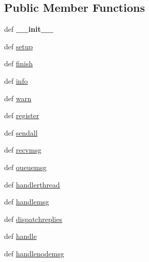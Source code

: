 \subsection*{Public Member Functions}
\begin{DoxyCompactItemize}
\item 
\hypertarget{classcore_1_1coreserver_1_1_core_request_handler_ac0ae6bd3cd1de47c47234e4f2ede84d5}{def {\bfseries \+\_\+\+\_\+init\+\_\+\+\_\+}}\label{classcore_1_1coreserver_1_1_core_request_handler_ac0ae6bd3cd1de47c47234e4f2ede84d5}

\item 
def \hyperlink{classcore_1_1coreserver_1_1_core_request_handler_a08012ae7f3b607a6e5309be961fa6de2}{setup}
\item 
def \hyperlink{classcore_1_1coreserver_1_1_core_request_handler_a8284268bb5515abe6e525ea0fedb5b04}{finish}
\item 
def \hyperlink{classcore_1_1coreserver_1_1_core_request_handler_a63af1dbd88a97af1c8788c979b995792}{info}
\item 
def \hyperlink{classcore_1_1coreserver_1_1_core_request_handler_a0f4f6eee112068adc26f8edd009f0f0d}{warn}
\item 
def \hyperlink{classcore_1_1coreserver_1_1_core_request_handler_a191167b6251c9224977f11a3ca979299}{register}
\item 
def \hyperlink{classcore_1_1coreserver_1_1_core_request_handler_a5bdb39440c4533cab80c56465cd93f1c}{sendall}
\item 
def \hyperlink{classcore_1_1coreserver_1_1_core_request_handler_a677a32e6691f80f7347236761bf434ad}{recvmsg}
\item 
def \hyperlink{classcore_1_1coreserver_1_1_core_request_handler_ae943cc83d5d7a9c698b3efd48f33225c}{queuemsg}
\item 
def \hyperlink{classcore_1_1coreserver_1_1_core_request_handler_ae9390dc75711f22d5bbfdce57c11cabd}{handlerthread}
\item 
def \hyperlink{classcore_1_1coreserver_1_1_core_request_handler_abc1b834904db746ce212c86d8757034b}{handlemsg}
\item 
def \hyperlink{classcore_1_1coreserver_1_1_core_request_handler_aee4c913dd0b53f11588447590985711b}{dispatchreplies}
\item 
def \hyperlink{classcore_1_1coreserver_1_1_core_request_handler_a7357abc4dd8ccc66a2c10c8548f02ea3}{handle}
\item 
def \hyperlink{classcore_1_1coreserver_1_1_core_request_handler_aee41713aa2ff8921a09c1a853f8f77ea}{handlenodemsg}

\end{DoxyCompactItemize}

